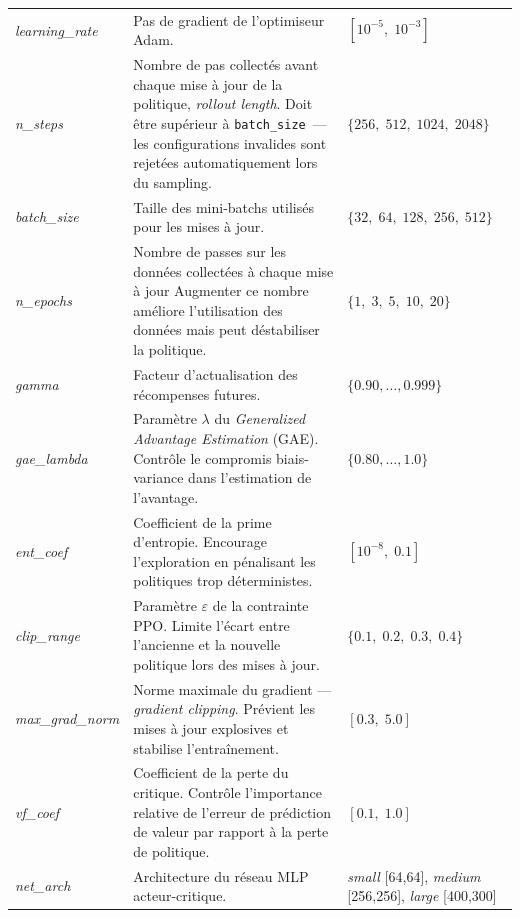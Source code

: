 \begin{longtable}{%
  p{\hpColA}%
  p{\dimexpr\textwidth - \hpColA - \hpColC - 6\tabcolsep\relax}%
  p{\hpColC}%
}
\textit{learning\_rate}
  & Pas de gradient de l'optimiseur Adam.
  & $[10^{-5},\;10^{-3}]$ \\[4pt]
\textit{n\_steps}
  & Nombre de pas collectés avant chaque mise à jour de la politique,
    \textit{rollout length}. Doit être supérieur
    à \texttt{batch\_size}~--- les configurations invalides sont rejetées
    automatiquement lors du sampling.
  & $\{256,\;512,\;1024,\;2048\}$ \\[4pt]
\textit{batch\_size}
  & Taille des mini-batchs utilisés pour les mises à jour.
  & $\{32,\;64,\;128,\;256,\;512\}$ \\[4pt]
\textit{n\_epochs}
  & Nombre de passes sur les données collectées à chaque mise à jour Augmenter ce nombre améliore l'utilisation des données mais peut déstabiliser la politique.
  & $\{1,\;3,\;5,\;10,\;20\}$ \\[4pt]
\textit{gamma}
  & Facteur d'actualisation des récompenses futures.
  & $\{0.90,\ldots,0.999\}$ \\[4pt]
\textit{gae\_lambda}
  & Paramètre $\lambda$ du \textit{Generalized Advantage Estimation} (GAE). Contrôle le compromis biais-variance dans
    l'estimation de l'avantage.
  & $\{0.80,\ldots,1.0\}$ \\[4pt]
\textit{ent\_coef}
  & Coefficient de la prime d'entropie.
    Encourage l'exploration en pénalisant les politiques trop
    déterministes.
  & $[10^{-8},\;0.1]$ \\[4pt]
\textit{clip\_range}
  & Paramètre $\varepsilon$ de la contrainte PPO.
    Limite l'écart entre l'ancienne et la nouvelle politique lors des
    mises à jour.
  & $\{0.1,\;0.2,\;0.3,\;0.4\}$ \\[4pt]
\textit{max\_grad\_norm}
  & Norme maximale du gradient --- \textit{gradient clipping}. Prévient les mises à jour explosives et
    stabilise l'entraînement.
  & $[0.3,\;5.0]$ \\[4pt]
\textit{vf\_coef}
  & Coefficient de la perte du critique. Contrôle
    l'importance relative de l'erreur de prédiction de valeur par rapport
    à la perte de politique.
  & $[0.1,\;1.0]$ \\[4pt]
\textit{net\_arch}
  & Architecture du réseau MLP acteur-critique.
  & \textit{small} [64,64],\newline
    \textit{medium} [256,256],\newline
    \textit{large} [400,300] \\
\end{longtable}
\endgroup

